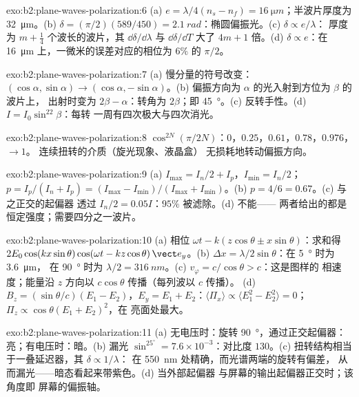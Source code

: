 \begin{solution}{exo:b2:plane-waves-polarization:6}
(a) $e = \lambda/4(n_s - n_f) = \qty{16}{\micro m}$；半波片厚度为 \qty{32}{\micro m}。(b) $\delta =
(\pi/2)(589/450) = \qty{2.1}{rad}$：椭圆偏振光。(c) $\delta \propto e/\lambda$：
厚度为 $m + \tfrac14$ 个波长的波片，其 $\dd\delta/\dd\lambda$ 与 $\dd\delta/\dd T$ 大了
$4m + 1$ 倍。(d) $\delta \propto e$：在 \qty{16}{\micro m} 上，一微米的误差对应的相位为 $6\%$ 的 $\pi/2$。
\end{solution}

\begin{solution}{exo:b2:plane-waves-polarization:7}
(a) 慢分量的符号改变：$(\cos\alpha, \sin\alpha) \to (\cos\alpha,
-\sin\alpha)$。(b) 偏振方向为 $\alpha$ 的光入射到方位为 $\beta$ 的波片上，
出射时变为 $2\beta - \alpha$：转角为 $2\beta$；即 \qty{45}{\degree}。(c)
反转手性。(d) $I = I_0\sin^22\beta$：每转
一周有四次极大与四次消光。
\end{solution}

\begin{solution}{exo:b2:plane-waves-polarization:8}
$\cos^{2N}(\pi/2N)$：$0$，$0.25$，$0.61$，$0.78$，$0.976$，$\to 1$。
连续扭转的介质（旋光现象、液晶盒）
无损耗地转动偏振方向。
\end{solution}

\begin{solution}{exo:b2:plane-waves-polarization:9}
(a) $I_{\max} = I_n/2 + I_p$，$I_{\min} = I_n/2$；$p = I_p/(I_n + I_p) = (I_{\max} -
I_{\min})/(I_{\max} + I_{\min})$。(b) $p = 4/6 = 0.67$。(c) 与之正交的起偏器
透过 $I_n/2 = 0.05I$：$95\%$ 被滤除。(d) 不能——
两者给出的都是恒定强度；需要四分之一波片。
\end{solution}

\begin{solution}{exo:b2:plane-waves-polarization:10}
(a) 相位 $\omega t - k(z\cos\theta \pm x\sin\theta)$：求和得 $2E_0\cos(kx\sin\theta)\cos(\omega t
- kz\cos\theta)\,\vect e_y$。(b) $\Delta x = \lambda/2\sin\theta$：在 \qty{5}{\degree} 时为 \qty{3.6}{\micro m}，
在 \qty{90}{\degree} 时为 $\lambda/2 = \qty{316}{nm}$。(c) $v_\varphi = c/\cos\theta > c$：这是图样的
相速度；能量沿 $z$ 方向以 $c\cos\theta$ 传播（每列波以 $c$ 传播）。
(d) $B_z = (\sin\theta/c)(E_1 - E_2)$，$E_y = E_1 + E_2$：$\langle\Pi_x\rangle \propto
\langle E_1^2 - E_2^2\rangle = 0$；$\Pi_z \propto \cos\theta(E_1 + E_2)^2$，在
亮面处最大。
\end{solution}

\begin{solution}{exo:b2:plane-waves-polarization:11}
(a) 无电压时：旋转 \qty{90}{\degree}，通过正交起偏器：
亮；有电压时：暗。(b) 漏光 $\sin^25^\circ = 7.6 \times 10^{-3}$：对比度
$130$。(c) 扭转结构相当于一叠延迟器，其 $\delta \propto 1/\lambda$：
在 \qty{550}{nm} 处精确，而光谱两端的旋转有偏差，
从而漏光——暗态看起来带紫色。(d) 当外部起偏器
与屏幕的输出起偏器正交时；该角度即
屏幕的偏振轴。
\end{solution}

